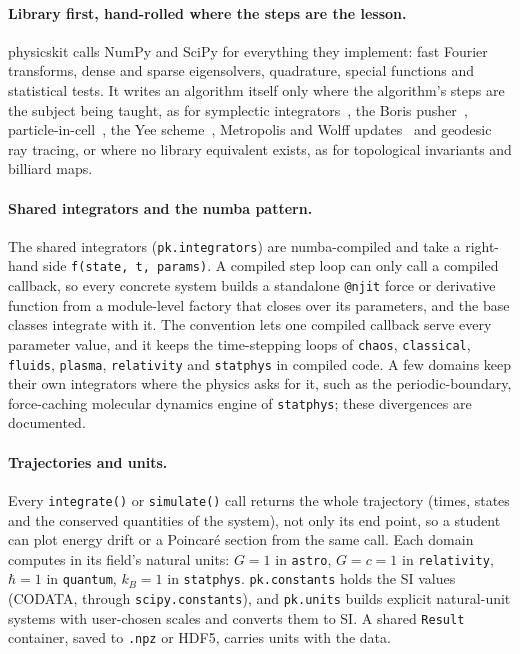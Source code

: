 \documentclass[11pt,a4paper]{article}
\newcommand{\code}[1]{\texttt{#1}}
\begin{document}
\paragraph{Library first, hand-rolled where the steps are the lesson.}
physicskit calls NumPy and SciPy for everything they implement: fast
Fourier transforms, dense and sparse eigensolvers, quadrature, special
functions and statistical tests. It writes an algorithm itself only where
the algorithm's steps are the subject being taught, as for symplectic
integrators~\cite{yoshida1990}, the Boris pusher~\cite{boris1970},
particle-in-cell~\cite{birdsall1991}, the Yee scheme~\cite{yee1966},
Metropolis and Wolff updates~\cite{metropolis1953,wolff1989} and geodesic
ray tracing, or where no library equivalent exists, as for topological
invariants and billiard maps.

\paragraph{Shared integrators and the numba pattern.} The shared
integrators (\code{pk.integrators}) are numba-compiled and take a
right-hand side \code{f(state, t, params)}. A compiled step loop can only
call a compiled callback, so every concrete system builds a standalone
\code{@njit} force or derivative function from a module-level factory that
closes over its parameters, and the base classes integrate with it. The
convention lets one compiled callback serve every parameter value, and it
keeps the time-stepping loops of \code{chaos}, \code{classical},
\code{fluids}, \code{plasma}, \code{relativity} and \code{statphys} in
compiled code. A few domains keep their own integrators where the physics
asks for it, such as the periodic-boundary, force-caching molecular
dynamics engine of \code{statphys}; these divergences are documented.

\paragraph{Trajectories and units.} Every \code{integrate()} or
\code{simulate()} call returns the whole trajectory (times, states and the
conserved quantities of the system), not only its end point, so a student
can plot energy drift or a Poincar\'e section from the same call. Each
domain computes in its field's natural units: $G=1$ in \code{astro},
$G=c=1$ in \code{relativity}, $\hbar=1$ in \code{quantum}, $k_B=1$ in
\code{statphys}. \code{pk.constants} holds the SI values (CODATA, through
\code{scipy.constants}), and \code{pk.units} builds explicit natural-unit
systems with user-chosen scales and converts them to SI. A shared
\code{Result} container, saved to \code{.npz} or HDF5, carries units with
the data.
\end{document}
